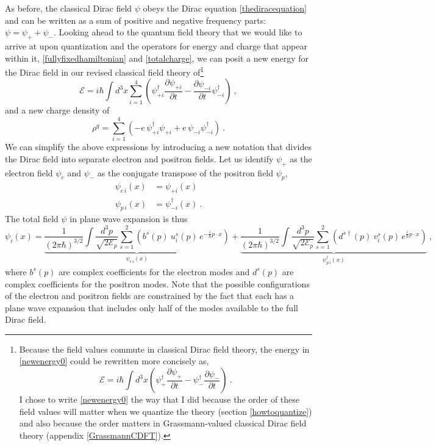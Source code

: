 \documentclass[12pt,secnumarabic,amsmath,amssymb,balancelastpage,nofootinbib]{article}
\begin{document}
As before, the classical Dirac field $\psi$ obeys the Dirac equation \eqref{thediracequation} and can be written as a sum of positive and negative frequency parts: $\psi=\psi_+ + \psi_-$.  Looking ahead to the quantum field theory that we would like to arrive at upon quantization and the operators for energy and charge that appear within it, \eqref{fullyfixedhamiltonian} and \eqref{totalcharge}, we can posit a new energy for the Dirac field in our revised classical field theory of\footnote{Because the field values commute in classical Dirac field theory, the energy in \eqref{newenergy0} could be rewritten more concisely as,
\begin{equation}
\mathcal{E}=i \hbar \int{d^3 x \left( \psi_+^\dagger\frac{\partial \psi_+}{\partial t} - \psi_-^\dagger\frac{\partial \psi_-}{\partial t}\right)}
\ .
\end{equation}
I chose to write \eqref{newenergy0} the way that I did because the order of these field values will matter when we quantize the theory (section \ref{howtoquantize}) and also because the order matters in Grassmann-valued classical Dirac field theory (appendix \ref{GrassmannCDFT}).} 
\begin{equation}
\mathcal{E}=i \hbar \int{d^3 x  \sum_{i=1}^4\left(\psi^{\dagger}_{+i}\frac{\partial \psi_{+i}}{\partial t}-\frac{\partial \psi_{-i}}{\partial t}\psi^{\dagger}_{-i} \right)}
\label{newenergy0}
\ ,
\end{equation}
and a new charge density of
\begin{equation}
\rho^q=\sum_{i=1}^4\left(-e\,\psi^{\dagger}_{+i} \psi_{+i}+e\,\psi_{-i}\psi^{\dagger}_{-i} \right)
\label{revisedchargedensity0}
\ .
\end{equation}
We can simplify the above expressions by introducing a new notation that divides the Dirac field into separate electron and positron fields.  Let us identify $\psi_+$ as the electron field $\psi_e$ and $\psi_-$ as the conjugate transpose of the positron field $\psi_p$,
\begin{align}
\psi_{e \, i}(x)&=\psi_{+ i}(x)
\nonumber
\\
\psi_{p \, i}(x)&=\psi^{\dagger}_{- i}(x)
\ .
\label{electronandpositronfields}
\end{align}
The total field $\psi$ in plane wave expansion is thus
\begin{equation}
\psi_i (x) =\underbrace{\frac{1}{(2\pi\hbar)^{3/2}}\int{ \frac{d^3 p}{\sqrt{2 \mathcal{E}_p}} \sum_{s=1}^2 \left(b^{s} (p) \: u_i^s (p) \, e^{-\frac{i}{\hbar} p \cdot x}\right)}}_{\mbox{$\psi_{e \, i}(x)$}}
+\underbrace{\frac{1}{(2\pi\hbar)^{3/2}}\int{ \frac{d^3 p}{\sqrt{2 \mathcal{E}_p}} \sum_{s=1}^2 \left(d^{s \dagger} (p) \: v_i^s (p) \,  e^{\frac{i}{\hbar} p \cdot x}\right)}}_{\mbox{$\psi^{\dagger}_{p \, i}(x)$}}
\ ,
\label{newplanewaveexpansion}
\end{equation}
where $b^{s} (p)$ are complex coefficients for the electron modes and $d^{s} (p)$ are complex coefficients for the positron modes.  Note that the possible configurations of the electron and positron fields are constrained by the fact that each has a plane wave expansion that includes only half of the modes available to the full Dirac field.
\end{document}
